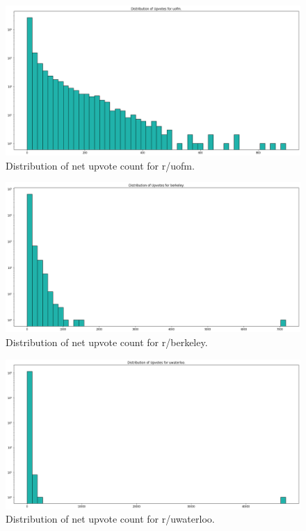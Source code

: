 \documentclass[11pt,a4paper]{article}
\begin{document}
    \begin{figure}[!htb]
        \includegraphics[width=\textwidth]{uofm_upvotes.png}
        \caption{Distribution of net upvote count for r/uofm.}
    \end{figure}

    \begin{figure}[!htb]
        \includegraphics[width=\textwidth]{berkeley_upvotes.png}
        \caption{Distribution of net upvote count for r/berkeley.}
    \end{figure}

    \begin{figure}[!htb]
        \includegraphics[width=\textwidth]{uwaterloo_upvotes.png}
        \caption{Distribution of net upvote count for r/uwaterloo.}
    \end{figure}
\end{document}
